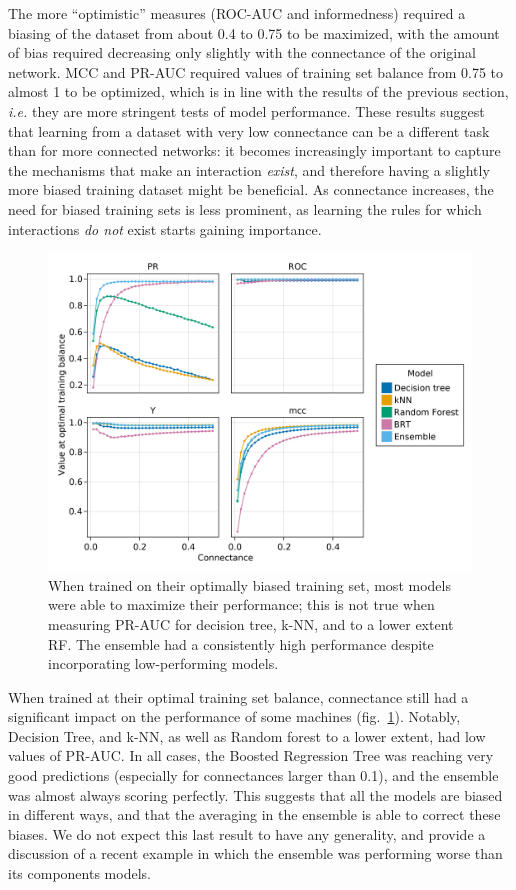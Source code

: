 \documentclass[11pt]{article}
\makeatletter
\def\maxwidth{\ifdim\Gin@nat@width>\linewidth\linewidth
\else\Gin@nat@width\fi}
\let\Oldincludegraphics\includegraphics
\renewcommand{\includegraphics}[1]{\Oldincludegraphics[width=\maxwidth]{#1}}
\makeatother
\begin{document}
The more ``optimistic'' measures (ROC-AUC and informedness) required a
biasing of the dataset from about 0.4 to 0.75 to be maximized, with the
amount of bias required decreasing only slightly with the connectance of
the original network. MCC and PR-AUC required values of training set
balance from 0.75 to almost 1 to be optimized, which is in line with the
results of the previous section, \emph{i.e.} they are more stringent
tests of model performance. These results suggest that learning from a
dataset with very low connectance can be a different task than for more
connected networks: it becomes increasingly important to capture the
mechanisms that make an interaction \emph{exist}, and therefore having a
slightly more biased training dataset might be beneficial. As
connectance increases, the need for biased training sets is less
prominent, as learning the rules for which interactions \emph{do not}
exist starts gaining importance.

\begin{figure}
\hypertarget{fig:optimvalue}{%
\centering
\includegraphics{figures/optimal_value.png}
\caption{When trained on their optimally biased training set, most
models were able to maximize their performance; this is not true when
measuring PR-AUC for decision tree, k-NN, and to a lower extent RF. The
ensemble had a consistently high performance despite incorporating
low-performing models.}\label{fig:optimvalue}
}
\end{figure}

When trained at their optimal training set balance, connectance still
had a significant impact on the performance of some machines
(fig.~\ref{fig:optimvalue}). Notably, Decision Tree, and k-NN, as well
as Random forest to a lower extent, had low values of PR-AUC. In all
cases, the Boosted Regression Tree was reaching very good predictions
(especially for connectances larger than 0.1), and the ensemble was
almost always scoring perfectly. This suggests that all the models are
biased in different ways, and that the averaging in the ensemble is able
to correct these biases. We do not expect this last result to have any
generality, and provide a discussion of a recent example in which the
ensemble was performing worse than its components models.
\end{document}

